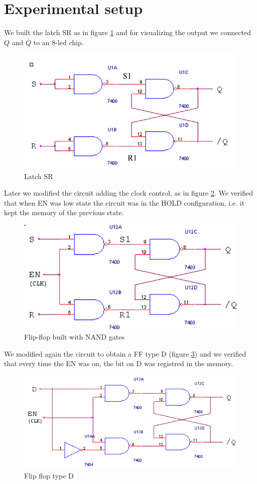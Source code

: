 \section{Experimental setup}
We built the latch SR as in figure \ref{SR_NAND} and for visualizing the output we  connected $Q$ and $\overline{Q}$ to an 8-led chip.
\begin{figure}[H]
\centering
\includegraphics[width=.7\textwidth]{11/SR_NAND.png}
\caption{Latch SR}\label{SR_NAND}
\end{figure}
Later we modified the circuit adding the clock control, as in figure \ref{FF_SR_NAND}. We verified that when EN was low state the circuit was in the HOLD configuration, i.e. it kept the memory of the previous state. 
\begin{figure}[H]
\centering
\includegraphics[width=.7\textwidth]{11/FF_SR_NAND.png}
\caption{Flip-flop built with NAND gates}\label{FF_SR_NAND}
\end{figure}
We modified again the circuit to obtain a FF type D (figure \ref{D_FF}) and we verified that every time the EN was on, the bit on D was registred in the memory.
\begin{figure}[H]
\centering
\includegraphics[width=.7\textwidth]{11/D_FF.png}
\caption{Flip flop type D}\label{D_FF}
\end{figure}
